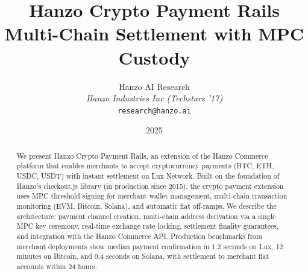\documentclass[11pt]{article}
\title{Hanzo Crypto Payment Rails\\[0.3em]
{\large Multi-Chain Settlement with MPC Custody}}
\author{
    Hanzo AI Research \\
    \textit{Hanzo Industries Inc (Techstars '17)} \\
    \texttt{research@hanzo.ai}
}
\date{2025}
\begin{document}
\hanzocoverpage

\begin{abstract}
We present Hanzo Crypto Payment Rails, an extension of the Hanzo Commerce
platform that enables merchants to accept cryptocurrency payments (BTC,
ETH, USDC, USDT) with instant settlement on Lux Network. Built on the
foundation of Hanzo's checkout.js library (in production since 2015),
the crypto payment extension uses MPC threshold signing for merchant
wallet management, multi-chain transaction monitoring (EVM, Bitcoin,
Solana), and automatic fiat off-ramps. We describe the architecture:
payment channel creation, multi-chain address derivation via a single MPC
key ceremony, real-time exchange rate locking, settlement finality
guarantees, and integration with the Hanzo Commerce API. Production
benchmarks from merchant deployments show median payment confirmation in
1.2 seconds on Lux, 12 minutes on Bitcoin, and 0.4 seconds on Solana,
with settlement to merchant fiat accounts within 24 hours.
\end{abstract}













\end{document}
